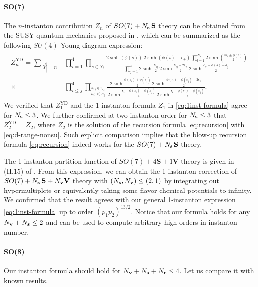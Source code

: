 \documentclass[letterpaper, 11pt]{article}
\def\e{\epsilon}
\begin{document}
{\paragraph{SO(7)} The $n$-instanton contribution $Z_n$ of $SO(7) + N_{\bf s}\,\mathbf{S}$ theory can be obtained from the SUSY quantum mechanics proposed in \cite{Kim:2018gjo}, which can be summarized as the following $SU(4)$ Young diagram expression:
\begin{align}
\begin{split}
  Z_n^\text{YD} = \sum_{|\vec{Y}| = n} &\prod_{i=1}^4\prod_{s \in Y_i}\frac{2\sinh{(\phi(s))} \ 2\sinh{(\phi(s)-\e_+)} \ \prod_{l=1}^{N_\textbf{s}}2\sinh(\frac{m_l \pm \phi(s)}{2}) }{\prod_{j=1}^4 2\sinh{\frac{E_{ij}}{2}}\,2\sinh{\frac{E_{ij}-2\e_+}{2}}\,2\sinh{\frac{\e_+ - \phi(s) - a_j}{2}}} \\ \times &\prod_{i \leq j}^4 \prod_{\stackrel{s_{i,j} \in Y_{i,j}}{s_i < s_j}} \frac{2\sinh{\frac{\phi(s_i)+\phi(s_j)}{2}}\, 2\sinh{\frac{\phi(s_i)+\phi(s_j)-2\e_+}{2}}}{ 2\sinh{\frac{\e_1 - \phi(s_i)-\phi(s_j)}{2}} \, 2\sinh{\frac{\e_2 - \phi(s_i)-\phi(s_j)}{2}}}.
\end{split}
\end{align}
We verified that $Z_1^\text{YD}$ and the 1-instanton formula $Z_1$ in \eqref{eq:1inst-formula} agree for $N_{\bf s} \leq 3$. We further confirmed at two instanton order for $N_{\bf s} \leq 3$ that $Z_2^\text{YD} = Z_2$, where $Z_2$ is  the solution of the recursion formula \eqref{eq:recursion} with \eqref{eq:d-range-nonsu}. Such explicit comparison implies that the blow-up recursion formula \eqref{eq:recursion} indeed works for the $SO(7) + N_{\bf s}\,\mathbf{S}$ theory. 

The 1-instanton partition function of $SO(7) + 4\mathbf{S} + 1\mathbf{V}$ theory is given in (H.15) of \cite{DelZotto:2018tcj}.
From this expression, we can obtain the 1-instanton correction of $SO(7) + N_{\bf s}\,\mathbf{S} + N_{\bf v}\mathbf{V}$ theory with $( N_{\bf s}, N_{\bf v}) \leq ( 2,1)$ by integrating out hypermultiplets or equivalently taking some flavor chemical potentials to infinity. We confirmed that the result agrees with our general 1-instanton expression \eqref{eq:1inst-formula} up to order $(p_1p_2)^{13/2}$. Notice that our formula holds for any $N_{\bf v} + N_{\bf s} \le 2$ and can be used to compute arbitrary high orders in instanton number. 

\paragraph{SO(8)}
Our instanton formula should hold for $N_{\bf v} + N_{\bf s} + N_{\bf c} \le 4$. Let us compare it with known results. 

}
\end{document}
